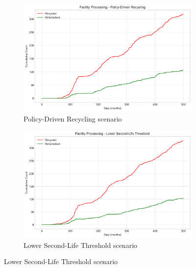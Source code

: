 \begin{figure}[htbp]
\vspace{0.2cm}
\begin{subfigure}{0.42\textwidth}
    \includegraphics[width=\textwidth]{figures/policy-driven_recycling_facility_processing.png}
    \caption{Policy-Driven Recycling scenario}
    \label{fig:facility_policy}
\end{subfigure}
\hfill
\begin{subfigure}{0.42\textwidth}
    \includegraphics[width=\textwidth]{figures/lower_second-life_threshold_facility_processing.png}
    \caption{Lower Second-Life Threshold scenario}
    \label{fig:facility_lower}
\end{subfigure}


\end{figure}
